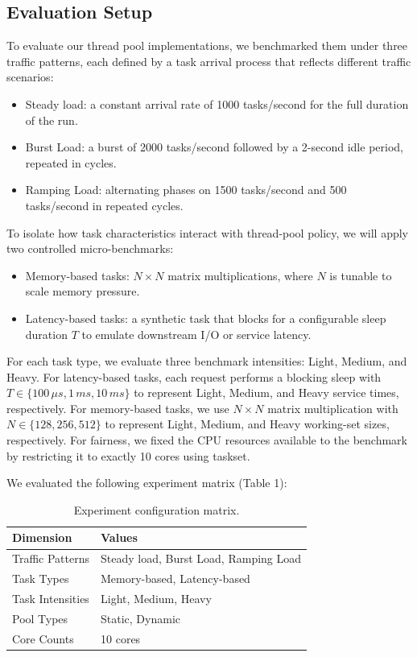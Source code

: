 \documentclass[sigconf, 10pt]{acmart}
\begin{document}
\subsection{Evaluation Setup} \label{sec:evaluaiton}

To evaluate our thread pool implementations, we benchmarked them under three traffic patterns, each defined by a task arrival process that reflects different traffic scenarios:
\begin{itemize}
  \item Steady load: a constant arrival rate of 1000 tasks/second for the full duration of the run.
  \item Burst Load: a burst of 2000 tasks/second followed by a 2-second idle period, repeated in cycles.
  \item Ramping Load: alternating phases on 1500 tasks/second and 500 tasks/second in repeated cycles.
\end{itemize}
To isolate how task characteristics interact with thread-pool policy, we will apply two controlled micro-benchmarks:
\begin{itemize}
    \item Memory-based tasks: $N\times N$ matrix multiplications, where $N$ is tunable to scale memory pressure.
    \item Latency-based tasks: a synthetic task that blocks for a configurable sleep duration $T$ to emulate downstream I/O or service latency.
\end{itemize}

For each task type, we evaluate three benchmark intensities: Light, Medium, and Heavy.
For latency-based tasks, each request performs a blocking sleep with $T \in \{100\, \mu s, 1\,ms, 10\,ms\}$ to represent Light, Medium, and Heavy service times, respectively.
For memory-based tasks, we use $N\times N$ matrix multiplication with $N \in \{128, 256, 512\}$ to represent Light, Medium, and Heavy working-set sizes, respectively.
For fairness, we fixed the CPU resources available to the benchmark by restricting it to exactly 10 cores using taskset.

We evaluated the following experiment matrix (Table 1):

\begin{table}[htbp]
\centering
\small
\begin{tabular}{ll}
\toprule
\textbf{Dimension} & \textbf{Values} \\
\midrule
Traffic Patterns & Steady load, Burst Load, Ramping Load \\
Task Types & Memory-based, Latency-based \\
Task Intensities & Light, Medium, Heavy \\
Pool Types & Static, Dynamic \\
Core Counts & 10 cores \\
\bottomrule
\end{tabular}
\caption{Experiment configuration matrix.}
\label{tab:config}
\end{table}
\end{document}
